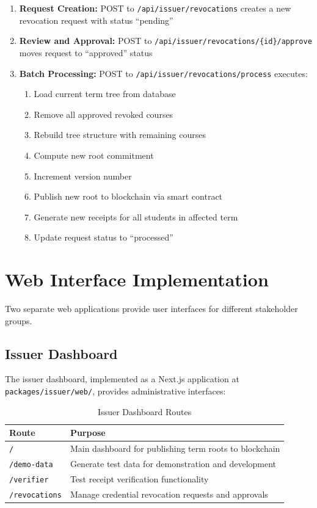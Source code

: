 \begin{enumerate}
    \item \textbf{Request Creation:} POST to \texttt{/api/issuer/revocations} creates a new revocation request with status ``pending''
    \item \textbf{Review and Approval:} POST to \texttt{/api/issuer/revocations/\{id\}/approve} moves request to ``approved'' status
    \item \textbf{Batch Processing:} POST to \texttt{/api/issuer/revocations/process} executes:
    \begin{enumerate}
        \item Load current term tree from database
        \item Remove all approved revoked courses
        \item Rebuild tree structure with remaining courses
        \item Compute new root commitment
        \item Increment version number
        \item Publish new root to blockchain via smart contract
        \item Generate new receipts for all students in affected term
        \item Update request status to ``processed''
    \end{enumerate}
\end{enumerate}

\section{Web Interface Implementation}
\label{sec:web-impl}

Two separate web applications provide user interfaces for different stakeholder groups.

\subsection{Issuer Dashboard}
\label{subsec:issuer-dashboard}

The issuer dashboard, implemented as a Next.js application at \texttt{packages/issuer/web/}, provides administrative interfaces:

\begin{table}[H]
\centering
\caption{Issuer Dashboard Routes}
\label{tab:issuer-routes}
\begin{tabular}{|p{3.5cm}|p{9.5cm}|}
\hline
\textbf{Route} & \textbf{Purpose} \\
\hline
\texttt{/} & Main dashboard for publishing term roots to blockchain \\
\hline
\texttt{/demo-data} & Generate test data for demonstration and development \\
\hline
\texttt{/verifier} & Test receipt verification functionality \\
\hline
\texttt{/revocations} & Manage credential revocation requests and approvals \\
\hline
\end{tabular}
\end{table}

